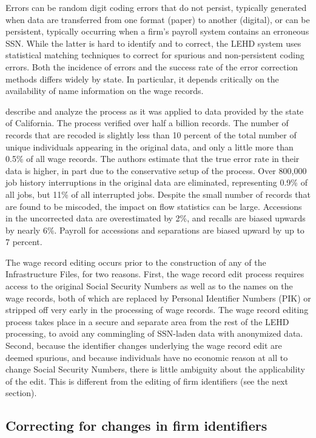 Errors can be random digit coding errors that do not persist, typically
generated when data are transferred from one format (paper) to another
(digital), or can be persistent, typically occurring when a firm's payroll
system contains an erroneous SSN. While the latter is hard to identify and
to correct, the LEHD system uses statistical matching techniques to correct
for spurious and non-persistent coding errors. Both the incidence of errors
and the success rate of the error correction methods differs widely by
state. In particular, it depends critically on the availability of name
information on the wage records. 

\citet{AbowdVilhuber2005} describe and analyze the process as it was
applied to data provided by the state of California. The process verified
over half a billion records. The number of records that are recoded is
slightly less than 10 percent of the total number of unique individuals
appearing in the original data, and only a little more than 0.5\% of all
wage records. The authors estimate that the true error rate in their data
is higher, in part due to the conservative setup of the process. Over
800,000 job history interruptions in the original data are eliminated,
representing 0.9\% of all jobs, but 11\% of all interrupted jobs. Despite the small number of records that are found to be miscoded, the impact on flow statistics can be large. Accessions in the uncorrected data are overestimated by 2\%, and recalls are biased upwards by nearly 6\%. Payroll for accessions and separations are biased upward by up to 7 percent. 

The wage record editing occurs prior to the construction of any of the
Infrastructure Files, for two reasons. First, the wage record edit process
requires access to the original Social Security Numbers as well as to the
names on the wage records, both of which are replaced by Personal
Identifier Numbers (PIK) or stripped off very early in the processing of
wage records. The wage record editing process takes place in a secure and
separate area from the rest of the LEHD processing, to avoid any
commingling of SSN-laden data with anonymized data. Second, because the
identifier changes underlying the wage record edit are deemed spurious, and
because individuals have no economic reason at all to change Social
Security Numbers, there is little
ambiguity about the applicability of the edit. This is different from the
editing of firm identifiers (see the next section).  

\subsection{Correcting for changes in firm identifiers}
\label{sec:input_spf}

